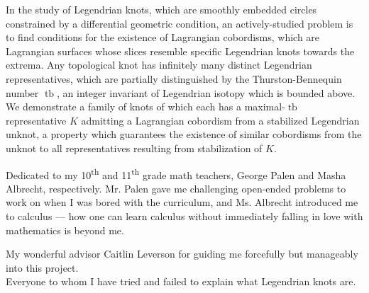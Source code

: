 \documentclass[11pt,twoside,reqno]{book}
\DeclareMathOperator{\tb}{tb}
\begin{document}

\abstr

In the study of Legendrian knots, which are smoothly embedded circles constrained by a differential geometric condition, an actively-studied problem is to find conditions for the existence of Lagrangian cobordisms, which are Lagrangian surfaces whose slices resemble specific Legendrian knots towards the extrema.
Any topological knot has infinitely many distinct Legendrian representatives, which are partially distinguished by the Thurston-Bennequin number $\tb$, an integer invariant of Legendrian isotopy which is bounded above.
We demonstrate a family of knots of which each has a maximal-$\tb$ representative $K$ admitting a Lagrangian cobordism from a stabilized Legendrian unknot, a property which guarantees the existence of similar cobordisms from the unknot to all representatives resulting from stabilization of $K$.

\dedic

Dedicated to my 10\textsuperscript{th} and 11\textsuperscript{th} grade math teachers, George Palen and Masha Albrecht, respectively. Mr. Palen gave me challenging open-ended problems to work on when I was bored with the curriculum, and Ms. Albrecht introduced me to calculus --- how one can learn calculus without immediately falling in love with mathematics is beyond me. 

\acknowl

My wonderful advisor Caitlin Leverson for guiding me forcefully but manageably into this project.\\
Everyone to whom I have tried and failed to explain what Legendrian knots are.

\tableofcontents

\startmain









\begin{appendices}

    

\end{appendices}

\printbibliography[heading=bibintoc]
\end{document}
